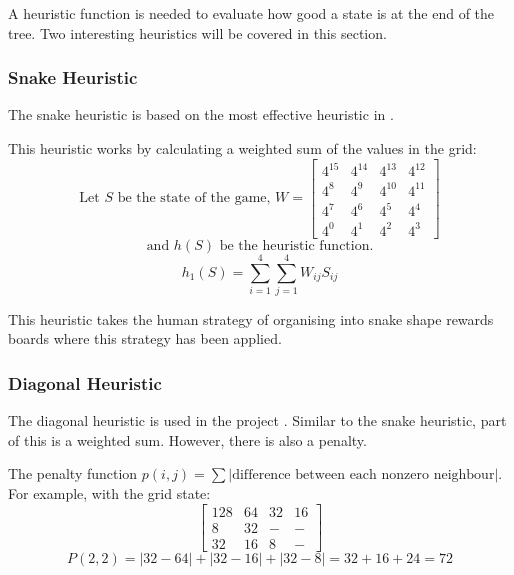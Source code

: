\documentclass{article}
\begin{document}
A heuristic function is needed to evaluate how good a state is at the end of the tree. Two interesting heuristics will be covered in this section. 

\subsubsection{Snake Heuristic}
\label{subsec:snake}
The snake heuristic is based on the most effective heuristic in \cite{aiplays2048}.

This heuristic works by calculating a weighted sum of the values in the grid:
\[
    \text{Let }S\text{ be the state of the game, }W=\begin{bmatrix}
    4^{15}&4^{14}&4^{13}&4^{12}\\
    4^8&4^9&4^{10}&4^{11}\\
    4^7&4^6&4^5&4^4\\
    4^0&4^1&4^2&4^3
    \end{bmatrix} \]\[\text{and }h(S)\text{ be the heuristic function.}
\]\[
    h_1(S)=\sum_{i=1}^{4}\sum_{j=1}^{4}W_{i j}S_{i j}
\]

This heuristic takes the human strategy of organising into snake shape rewards boards where this strategy has been applied.
\subsubsection{Diagonal Heuristic}
\label{subsubsec:diag}
The diagonal heuristic is used in the project \cite{expectimax2048}.
Similar to the snake heuristic, part of this is a weighted sum. However, there is also a penalty.

The penalty function $p(i, j) = \sum |\text{difference between each nonzero neighbour}|$. 
For example, with the grid state:
\[
\begin{bmatrix}
128 & 64 & 32 & 16 \\
8 & 32 & - &- \\
32 & 16 &8 &-
\end{bmatrix}\]\[
P(2, 2) = |32 - 64| + |32 - 16| + |32 - 8| = 32 + 16  + 24 = 72
\]
\end{document}
